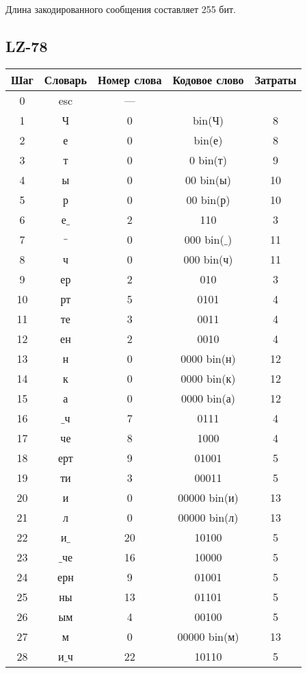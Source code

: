 Длина закодированного сообщения составляет 255 бит.

\subsection{LZ-78}

\begin{tabular}{|c|c|c|c|c|}
\hline
Шаг & Словарь & Номер слова & Кодовое слово & Затраты\\
\hline
0 & esc & {---} &  & \\
\hline
1 & Ч & 0 & bin(Ч) & 8\\
\hline
2 & е & 0 & bin(е) & 8\\
\hline
3 & т & 0 & 0 bin(т) & 9\\
\hline
4 & ы & 0 & 00 bin(ы) & 10\\
\hline
5 & р & 0 & 00 bin(р) & 10\\
\hline
6 & е$\_$ & 2 & 110 & 3\\
\hline
7 & $\_$ & 0 & 000 bin($\_$) & 11\\
\hline
8 & ч & 0 & 000 bin(ч) & 11\\
\hline
9 & ер & 2 & 010 & 3\\
\hline
10 & рт & 5 & 0101 & 4\\
\hline
11 & те & 3 & 0011 & 4\\
\hline
12 & ен & 2 & 0010 & 4\\
\hline
13 & н & 0 & 0000 bin(н) & 12\\
\hline
14 & к & 0 & 0000 bin(к) & 12\\
\hline
15 & а & 0 & 0000 bin(а) & 12\\
\hline
16 & $\_$ч & 7 & 0111 & 4\\
\hline
17 & че & 8 & 1000 & 4\\
\hline
18 & ерт & 9 & 01001 & 5\\
\hline
19 & ти & 3 & 00011 & 5\\
\hline
20 & и & 0 & 00000 bin(и) & 13\\
\hline
21 & л & 0 & 00000 bin(л) & 13\\
\hline
22 & и$\_$ & 20 & 10100 & 5\\
\hline
23 & $\_$че & 16 & 10000 & 5\\
\hline
24 & ерн & 9 & 01001 & 5\\
\hline
25 & ны & 13 & 01101 & 5\\
\hline
26 & ым & 4 & 00100 & 5\\
\hline
27 & м & 0 & 00000 bin(м) & 13\\
\hline
28 & и$\_$ч & 22 & 10110 & 5\\

\end{tabular}
